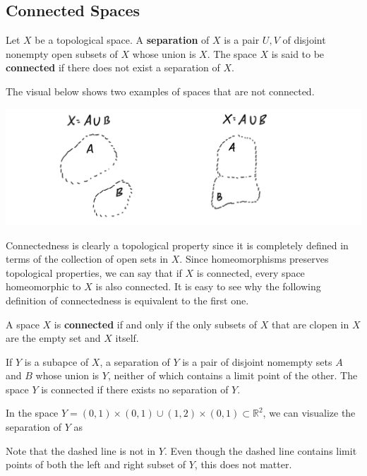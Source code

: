 \documentclass{article}
\begin{document}
  \subsection{Connected Spaces}

    \begin{definition}
    Let $X$ be a topological space. A \textbf{separation} of $X$ is a pair $U, V$ of disjoint nonempty open subsets of $X$ whose union is $X$. The space $X$ is said to be \textbf{connected} if there does not exist a separation of $X$. 

    The visual below shows two examples of spaces that are not connected. 
    \begin{center}
        \includegraphics[scale=0.25]{img/Not_Connected_Spaces_Examples.PNG}
    \end{center}
    \end{definition}

    Connectedness is clearly a topological property since it is completely defined in terms of the collection of open sets in $X$. Since homeomorphisms preserves topological properties, we can say that if $X$ is connected, every space homeomorphic to $X$ is also connected. It is easy to see why the following definition of connectedness is equivalent to the first one. 

    \begin{definition}
    A space $X$ is \textbf{connected} if and only if the only subsets of $X$ that are clopen in $X$ are the empty set and $X$ itself. 
    \end{definition}

    \begin{lemma}
    If $Y$ is a subapce of $X$, a separation of $Y$ is a pair of disjoint nomempty sets $A$ and $B$ whose union is $Y$, neither of which contains a limit point of the other. The space $Y$ is connected if there exists no separation of $Y$. 
    \end{lemma}
    \begin{example}
    In the space $Y = (0,1) \times (0,1) \cup (1,2) \times (0,1) \subset \mathbb{R}^2$, we can visualize the separation of $Y$ as
    \begin{center}
    \end{center}
    Note that the dashed line is not in $Y$. Even though the dashed line contains limit points of both the left and right subset of $Y$, this does not matter. 
    \end{example}
\end{document}
